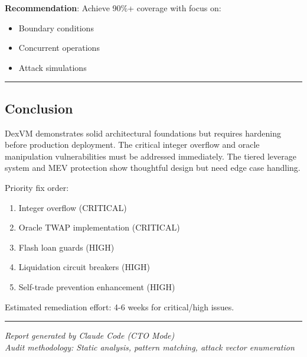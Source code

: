 \documentclass[
]{article}
\providecommand{\tightlist}{%
  \setlength{\itemsep}{0pt}\setlength{\parskip}{0pt}}
\begin{document}
\textbf{Recommendation}: Achieve 90\%+ coverage with focus on:

\begin{itemize}
\tightlist
\item
  Boundary conditions
\item
  Concurrent operations
\item
  Attack simulations
\end{itemize}

\begin{center}\rule{0.5\linewidth}{0.5pt}\end{center}

\subsection{Conclusion}\label{conclusion}

DexVM demonstrates solid architectural foundations but requires
hardening before production deployment. The critical integer overflow
and oracle manipulation vulnerabilities must be addressed immediately.
The tiered leverage system and MEV protection show thoughtful design but
need edge case handling.

Priority fix order:

\begin{enumerate}
\def\labelenumi{\arabic{enumi}.}
\tightlist
\item
  Integer overflow (CRITICAL)
\item
  Oracle TWAP implementation (CRITICAL)
\item
  Flash loan guards (HIGH)
\item
  Liquidation circuit breakers (HIGH)
\item
  Self-trade prevention enhancement (HIGH)
\end{enumerate}

Estimated remediation effort: 4-6 weeks for critical/high issues.

\begin{center}\rule{0.5\linewidth}{0.5pt}\end{center}

\emph{Report generated by Claude Code (CTO Mode)}\\
\emph{Audit methodology: Static analysis, pattern matching, attack
vector enumeration}
\end{document}
